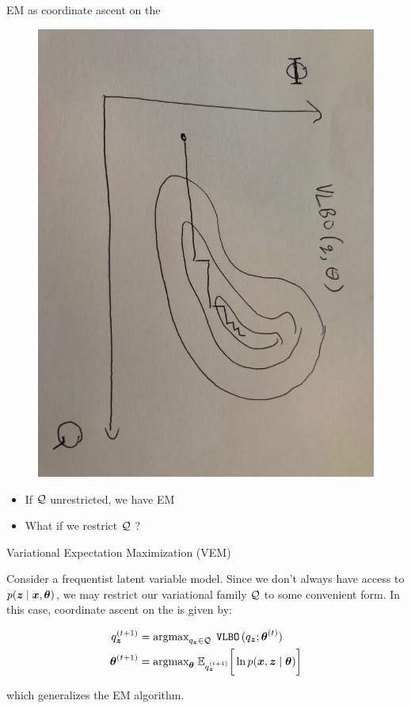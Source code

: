 \documentclass[10pt]{beamer}
\begin{document}
\begin{frame}{EM as coordinate ascent on the \VLBO }

	\begin{figure}
	\includegraphics[width=.55\textwidth, angle=90]{images/em_is_perfect_vi.jpg}
	\end{figure}

 
\begin{itemize}
\item If $\mathcal{Q}$ unrestricted, we have EM   
\item What if we restrict $\mathcal{Q}$ ?
\end{itemize}

\end{frame}


\begin{frame}{Variational Expectation Maximization (VEM)}

Consider a \alert{frequentist latent variable model}. Since we don't always have access to $p({\boldsymbol z} \; | \; {\boldsymbol x}, {\boldsymbol \theta})$, we may restrict our variational family $\mathcal{Q}$ to some convenient form.  In this case, 
coordinate ascent on the \VLBO is given by:

\begin{align*}
q_{{\boldsymbol z}}^{(t+1)} &= \text{argmax}_{q_{{\boldsymbol z}} \in \mathcal{Q}} \; \,\texttt{VLBO}\,  (q_{{\boldsymbol z}} ; {\boldsymbol \theta}^{(t)} )\label{ve_update} \\ 
{\boldsymbol \theta}^{(t+1)} &= \text{argmax}_{{\boldsymbol \theta}} \; \mathbb{E}_{q_{{\boldsymbol z}}^{(t+1)}} \bigg[ \ln p({\boldsymbol x}, {\boldsymbol z} \; | \; {\boldsymbol \theta}) \bigg]
\end{align*} 

which generalizes the EM algorithm. %
\end{frame}
\end{document}
